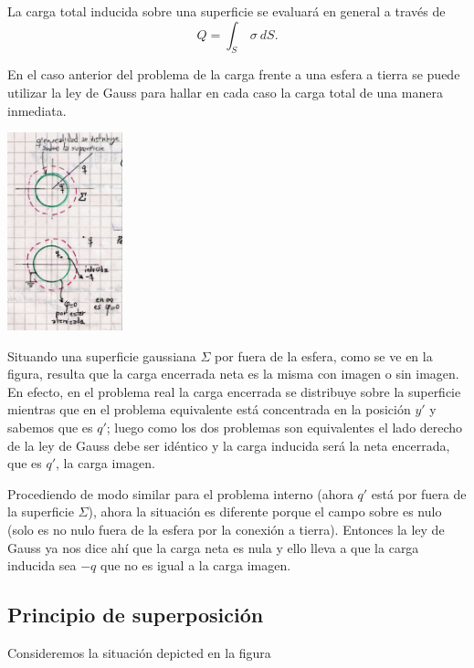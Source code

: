 \documentclass[10pt,oneside]{CBFT_book}
\begin{document}
La carga total inducida sobre una superficie se evaluará en general a través de
\[
	Q = \int_S \: \sigma \: dS.
\]

En el caso anterior del problema de la carga frente a una esfera a tierra se puede utilizar la ley de Gauss
para hallar en cada caso la carga total de una manera inmediata.

	\includegraphics[width=0.25\textwidth]{images/fig_ft1_calculo_carga_fast.jpg}	 

Situando una superficie gaussiana $\Sigma$ por fuera de la esfera, como se ve en la figura, resulta que la
carga encerrada neta es la misma con imagen o sin imagen. En efecto, en el problema real la carga encerrada
se distribuye sobre la superficie mientras que en el problema equivalente está concentrada en la posición
$y'$ y sabemos que es $q'$; luego como los dos problemas son equivalentes el lado derecho de la ley de 
Gauss debe ser idéntico y la carga inducida será la neta encerrada, que es $q'$, la carga imagen.

Procediendo de modo similar para el problema interno (ahora $q'$ está por fuera de la superficie $\Sigma$),
ahora la situación es diferente porque el campo sobre \Sigma es nulo (solo es no nulo fuera de la esfera
por la conexión a tierra). Entonces la ley de Gauss ya nos dice ahí que la carga neta es nula y ello
lleva a que la carga inducida sea $-q$ que no es igual a la carga imagen.


\subsection{Principio de superposición}

Consideremos la situación depicted en la figura
\end{document}
